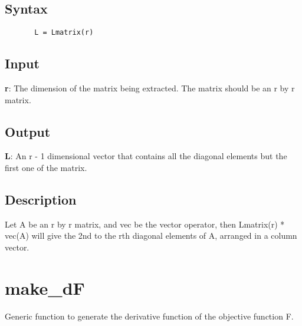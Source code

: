 \documentclass[a4paper,11pt,openany]{memoir}
\begin{document}
\subsection*{Syntax}


\begin{verbatim}       L = Lmatrix(r)\end{verbatim}
    

\subsection*{Input}

\begin{par}
\textbf{r}: The dimension of the matrix being extracted.  The matrix should be an r by r matrix.
\end{par} \vspace{1em}


\subsection*{Output}

\begin{par}
\textbf{L}: An r - 1 dimensional vector that contains all the diagonal elements but the first one of the matrix.
\end{par} \vspace{1em}


\subsection*{Description}

\begin{par}
Let A be an r by r matrix, and vec be the vector operator, then Lmatrix(r) * vec(A) will give the 2nd to the rth diagonal elements of A, arranged in a column vector.
\end{par} \vspace{1em}

\newpage

\rmfamily
\color{black}\section{make\_dF}

\begin{par}
Generic function to generate the derivative function of the objective function F.
\end{par} \vspace{1em}
\end{document}
